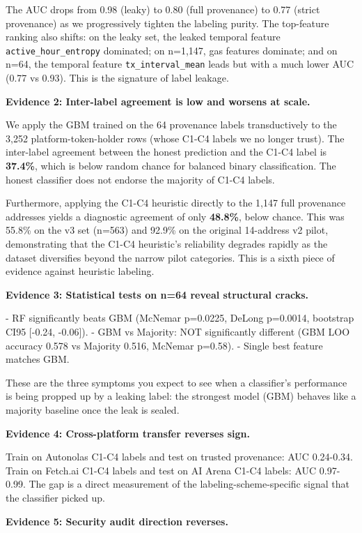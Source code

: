 \documentclass[sigconf,nonacm=false]{acmart}
\begin{document}
The AUC drops from 0.98 (leaky) to 0.80 (full provenance) to 0.77 (strict provenance) as we progressively tighten the labeling purity. The top-feature ranking also shifts: on the leaky set, the leaked temporal feature \texttt{active\_hour\_entropy} dominated; on n=1,147, gas features dominate; and on n=64, the temporal feature \texttt{tx\_interval\_mean} leads but with a much lower AUC (0.77 vs 0.93). This is the signature of label leakage.

\textbf{Evidence 2: Inter-label agreement is low and worsens at scale.}

We apply the GBM trained on the 64 provenance labels transductively to the 3,252 platform-token-holder rows (whose C1-C4 labels we no longer trust). The inter-label agreement between the honest prediction and the C1-C4 label is \textbf{37.4\%}, which is below random chance for balanced binary classification. The honest classifier does not endorse the majority of C1-C4 labels.

Furthermore, applying the C1-C4 heuristic directly to the 1,147 full provenance addresses yields a diagnostic agreement of only \textbf{48.8\%}, below chance. This was 55.8\% on the v3 set (n=563) and 92.9\% on the original 14-address v2 pilot, demonstrating that the C1-C4 heuristic's reliability degrades rapidly as the dataset diversifies beyond the narrow pilot categories. This is a sixth piece of evidence against heuristic labeling.

\textbf{Evidence 3: Statistical tests on n=64 reveal structural cracks.}

- RF significantly beats GBM (McNemar p=0.0225, DeLong p=0.0014, bootstrap CI95 [-0.24, -0.06]).
- GBM vs Majority: NOT significantly different (GBM LOO accuracy 0.578 vs Majority 0.516, McNemar p=0.58).
- Single best feature matches GBM.

These are the three symptoms you expect to see when a classifier's performance is being propped up by a leaking label: the strongest model (GBM) behaves like a majority baseline once the leak is sealed.

\textbf{Evidence 4: Cross-platform transfer reverses sign.}

Train on Autonolas C1-C4 labels and test on trusted provenance: AUC 0.24-0.34. Train on Fetch.ai C1-C4 labels and test on AI Arena C1-C4 labels: AUC 0.97-0.99. The gap is a direct measurement of the labeling-scheme-specific signal that the classifier picked up.

\textbf{Evidence 5: Security audit direction reverses.}
\end{document}
